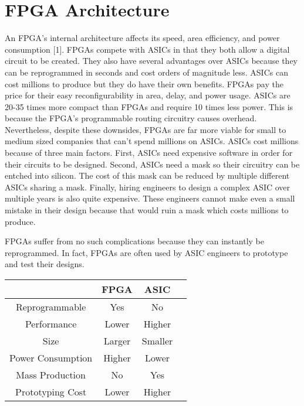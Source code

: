 \documentclass{article}
\begin{document}
    \section{FPGA Architecture}

    An FPGA's internal architecture affects its speed, area efficiency, and power consumption [1].
    FPGAs compete with ASICs in that they both allow a digital circuit to be created.
    They also have several advantages over ASICs because they can be reprogrammed in seconds
    and cost orders of magnitude less. ASICs can cost millions to produce but they do have
    their own benefits. FPGAs pay the price for their easy reconfigurability in area, delay,
    and power usage. ASICs are 20-35 times more compact than FPGAs and require 10 times less power.
    This is because the FPGA's programmable routing circuitry causes overhead. Nevertheless,
    despite these downsides, FPGAs are far more viable for small to medium sized companies
    that can't spend millions on ASICs. ASICs cost millions because of three main factors.
    First, ASICs need expensive software in order for their circuits to be designed.
    Second, ASICs need a mask so their circuitry can be entched into silicon.
    The cost of this mask can be reduced by multiple different ASICs sharing a mask.
    Finally, hiring engineers to design a complex ASIC over multiple years is also quite
    expensive. These engineers cannot make even a small mistake in their design
    because that would ruin a mask which costs millions to produce.

    FPGAs suffer from no such complications because they can instantly be reprogrammed.
    In fact, FPGAs are often used by ASIC engineers to prototype and test their designs.

    \begin{center}
        \begin{tabular}{ |c|c|c|c| }
            \hline
             & FPGA & ASIC \\
            \hline
            Reprogrammable & Yes & No \\
            Performance & Lower & Higher \\
            Size & Larger & Smaller \\
            Power Consumption & Higher & Lower \\
            Mass Production & No & Yes \\
            Prototyping Cost & Lower & Higher \\
            \hline
        \end{tabular}
    \end{center}
    
\end{document}
